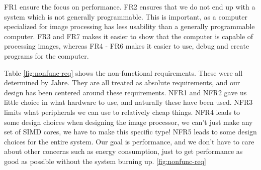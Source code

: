 {\sc FR1} ensure the focus on performance. {\sc FR2} ensures that we do not end
up with a system which is not generally programmable. This is important, as a
computer specialized for image processing has less usability than a generally
programmable computer. {\sc FR3} and {\sc FR7} makes it easier to show that the
computer is capable of processing images, whereas {\sc FR4 - FR6} makes it
easier to use, debug and create programs for the computer.



Table \ref{fig:nonfunc-req} shows the non-functional requirements. These were
all determined by Jahre. They are all treated as absolute requirements, and our
design has been centered around these requirements. {\sc NFR1} and {\sc NFR2} gave us little
choice in what hardware to use, and naturally these have been used. {\sc NFR3} limits
what peripherals we can use to relatively cheap things. {\sc NFR4} leads to some design
choices when designing the image processor, we can't just make any set of SIMD cores, we have
to make this specific type!  {\sc NFR5} leads to some design choices for the entire system.
Our goal is performance, and we don't have to care about other concerns such as energy
consumption, just to get performance as good as possible without the system burning up.
\ref{fig:nonfunc-req}
